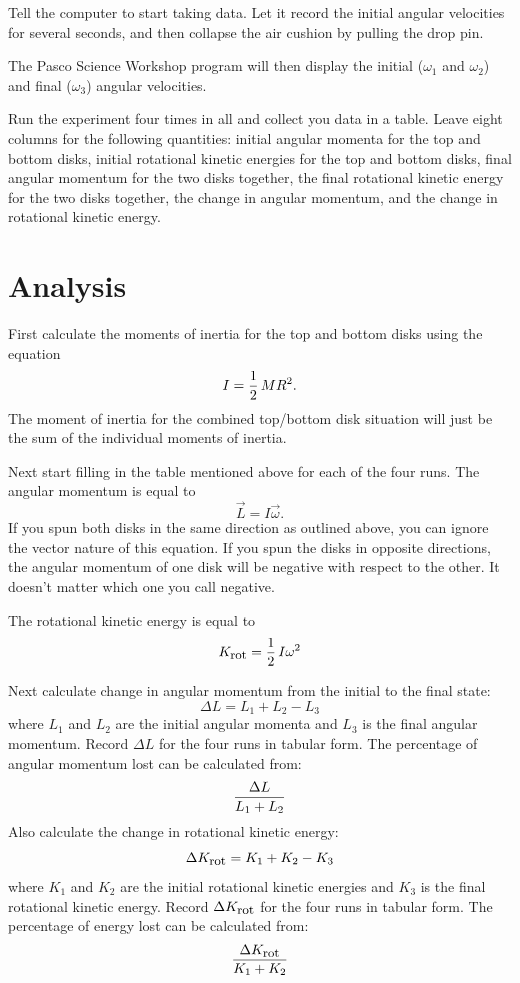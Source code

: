 Tell the computer to start taking data.  Let it record the initial
angular velocities for several seconds, and then collapse the air
cushion by pulling the drop pin.

The Pasco Science Workshop program will then display
the initial ($\omega_{1}$ and $\omega_{2}$) and final ($\omega_{3}$)
angular velocities.


Run the experiment four times in all and collect you data in a table.
Leave
eight columns for the following quantities: initial angular momenta for the top
and bottom disks, initial rotational kinetic energies for the top and bottom
disks, final angular momentum for the two disks together, the final
rotational kinetic energy for the two disks together, the change in angular
momentum, and the change in rotational kinetic energy.

\section*{Analysis}
First calculate the moments of inertia for the top and bottom disks using the
equation
\[
I = {{1} \over {2}} \, MR^{2}.
\]
The moment of inertia for the combined top/bottom disk situation will just be
the sum of the individual moments of inertia.

Next start filling in the table mentioned above for each of the four runs.
The angular momentum is equal to
\[
\vec{L} = I \vec{\omega}.
\]
If you spun both disks in the same direction as outlined above, you
can ignore the vector nature of this equation.  If you spun
the disks in opposite directions, the angular momentum of one disk
will be negative with respect to the other.  It doesn't matter which
one you call negative.

The rotational kinetic energy is equal to
\[
K_{\mbox{{\small rot}}} = {{1} \over {2}} \, I \omega^{2}
\]

Next calculate change in angular momentum from the initial to the final state:
\[
\Delta L = L_{1} + L_{2} - L_{3}
\]
where $L_{1}$ and $L_{2}$ are the initial angular momenta and $L_{3}$ is the
final angular momentum.  Record $\Delta L$ for the four runs in tabular form.
The percentage of angular momentum lost can be calculated from:
\[
{{\Delta L} \over {L_{1} + L_{2}}}
\]
Also calculate the change in rotational kinetic energy:
\[
\Delta K_{\mbox{{\small rot}}} = K_{1} + K_{2} - K_{3}
\]
where $K_{1}$ and $K_{2}$ are the initial rotational kinetic
energies and $K_{3}$ is the final rotational kinetic energy.  Record
$\Delta K_{\mbox{{\small rot}}}$ for the four runs in tabular form.
The percentage of energy lost can be calculated from:
\[
{{\Delta K_{\mbox{{\small rot}}}} \over {K_{1} + K_{2}}}
\]

